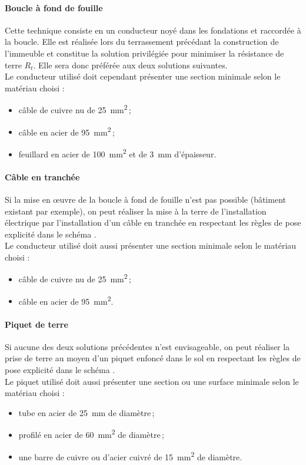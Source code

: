 \paragraph{Boucle à fond de fouille}
Cette technique consiste en un conducteur noyé dans les fondations et raccordée à la boucle. Elle est réalisée lors du terrassement précédant la construction de l'immeuble et constitue la solution privilégiée pour minimiser la résistance de terre $R_t$. Elle sera donc préférée aux deux solutions suivantes.\\
Le conducteur utilisé doit cependant présenter une section minimale selon le matériau choisi :
\begin{itemize}
\item câble de cuivre nu de \SI{25}{\square\milli\meter}\,;
\item câble en acier de \SI{95}{\square\milli\meter}\,;
\item feuillard en acier de \SI{100}{\square\milli\meter} et de \SI{3}{\milli\meter} d'épaisseur.
\end{itemize}


\paragraph{Câble en tranchée}
Si la mise en \oe{}uvre de la boucle à fond de fouille n'est pas possible (bâtiment existant par exemple), on peut réaliser la mise à la terre de l'installation électrique par l'installation d'un câble en tranchée en respectant les règles de pose explicité dans le schéma .\\
Le conducteur utilisé doit aussi présenter une section minimale selon le matériau choisi :
\begin{itemize}
\item câble de cuivre nu de \SI{25}{\square\milli\meter}\,;
\item câble en acier de \SI{95}{\square\milli\meter}.
\end{itemize}



\paragraph{Piquet de terre}
Si aucune des deux solutions précédentes n'est envisageable, on peut réaliser la prise de terre au moyen d'un piquet enfoncé dans le sol en respectant les règles de pose explicité dans le schéma .\\
Le piquet utilisé doit aussi présenter une section ou une surface minimale selon le matériau choisi :
\begin{itemize}
\item tube en acier de \SI{25}{\milli\meter} de diamètre\,;
\item profilé en acier de \SI{60}{\square\milli\meter} de diamètre\,;
\item une barre de cuivre ou d'acier cuivré de \SI{15}{\square\milli\meter} de diamètre.
\end{itemize}

